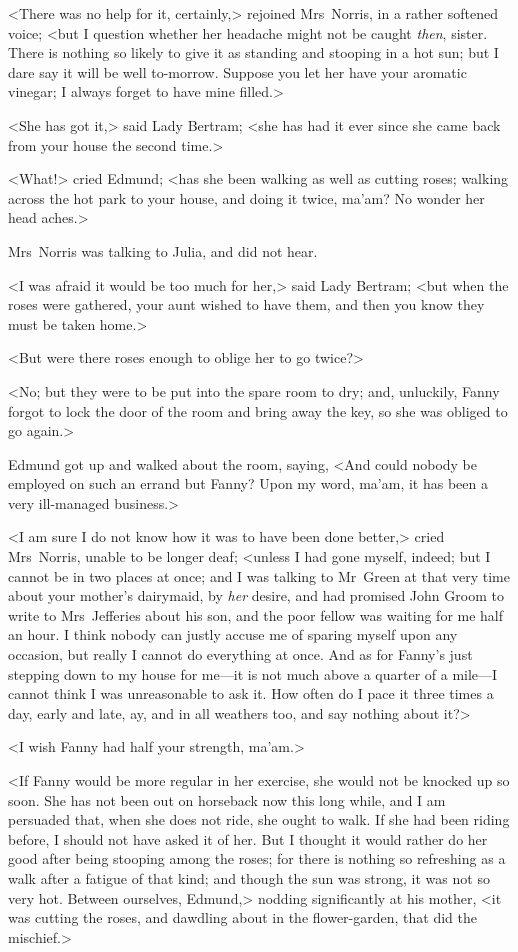 <There was no help for it, certainly,> rejoined Mrs~Norris, in a rather softened voice; <but I question whether her headache might not be caught \textit{then}, sister. There is nothing so likely to give it as standing and stooping in a hot sun; but I dare say it will be well to-morrow. Suppose you let her have your aromatic vinegar; I always forget to have mine filled.>

<She has got it,> said Lady Bertram; <she has had it ever since she came back from your house the second time.>

<What!> cried Edmund; <has she been walking as well as cutting roses; walking across the hot park to your house, and doing it twice, ma'am? No wonder her head aches.>

Mrs~Norris was talking to Julia, and did not hear.

<I was afraid it would be too much for her,> said Lady Bertram; <but when the roses were gathered, your aunt wished to have them, and then you know they must be taken home.>

<But were there roses enough to oblige her to go twice?>

<No; but they were to be put into the spare room to dry; and, unluckily, Fanny forgot to lock the door of the room and bring away the key, so she was obliged to go again.>

Edmund got up and walked about the room, saying, <And could nobody be employed on such an errand but Fanny? Upon my word, ma'am, it has been a very ill-managed business.>

<I am sure I do not know how it was to have been done better,> cried Mrs~Norris, unable to be longer deaf; <unless I had gone myself, indeed; but I cannot be in two places at once; and I was talking to Mr~Green at that very time about your mother's dairymaid, by \textit{her}  desire, and had promised John Groom to write to Mrs~Jefferies about his son, and the poor fellow was waiting for me half an hour. I think nobody can justly accuse me of sparing myself upon any occasion, but really I cannot do everything at once. And as for Fanny's just stepping down to my house for me—it is not much above a quarter of a mile—I cannot think I was unreasonable to ask it. How often do I pace it three times a day, early and late, ay, and in all weathers too, and say nothing about it?>

<I wish Fanny had half your strength, ma'am.>

<If Fanny would be more regular in her exercise, she would not be knocked up so soon. She has not been out on horseback now this long while, and I am persuaded that, when she does not ride, she ought to walk. If she had been riding before, I should not have asked it of her. But I thought it would rather do her good after being stooping among the roses; for there is nothing so refreshing as a walk after a fatigue of that kind; and though the sun was strong, it was not so very hot. Between ourselves, Edmund,> nodding significantly at his mother, <it was cutting the roses, and dawdling about in the flower-garden, that did the mischief.>

